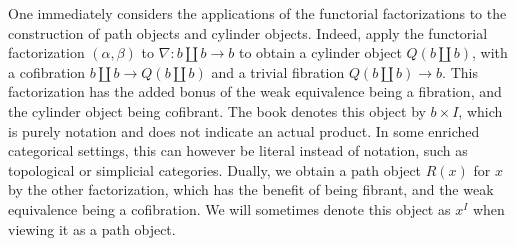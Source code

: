 \begin{remark}\label{1.2.11}
One immediately considers the applications of the functorial factorizations to the construction of path objects and cylinder objects. Indeed, apply the functorial factorization $(\alpha,\beta)$ to $\nabla : b\amalg b\to b$ to obtain a cylinder object $Q(b\amalg b) $, with a cofibration $b\amalg b\to Q(b\amalg b)$ and a trivial fibration $Q(b\amalg b)\to b$. This factorization has the added bonus of the weak equivalence being a fibration, and the cylinder object being cofibrant. The book denotes this object by $b\times I$, which is purely notation and does not indicate an actual product. In some enriched categorical settings, this can however be literal instead of notation, such as topological or simplicial categories. Dually, we obtain a path object $R(x)$ for $x$ by the other factorization, which has the benefit of being fibrant, and the weak equivalence being a cofibration. We will sometimes denote this object as $x^I$ when viewing it as a path object.
\end{remark}


